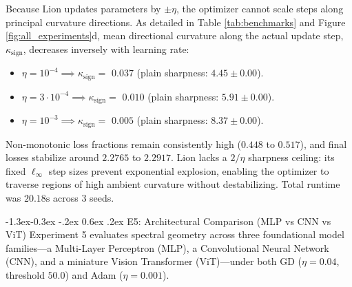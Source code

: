 \documentclass[10pt,twocolumn]{article}
\makeatletter
\renewcommand\subsection{\@startsection{subsection}{2}{\z@}%
                                     {-1.3ex\@plus -0.3ex \@minus -.2ex}%
                                     {0.6ex \@plus .2ex}%
                                     {\normalfont\normalsize\bfseries}}
\makeatother
\begin{document}
Because Lion updates parameters by $\pm \eta$, the optimizer cannot scale steps along principal curvature directions. As detailed in Table \ref{tab:benchmarks} and Figure \ref{fig:all_experiments}d, mean directional curvature along the actual update step, $\kappa_{\text{sign}}$, decreases inversely with learning rate:
\begin{itemize}
    \item $\eta = 10^{-4} \implies \kappa_{\text{sign}} =$
    $0.037$
    (plain sharpness:
    $4.45 \pm 0.00$).
    \item $\eta = 3 \cdot 10^{-4} \implies \kappa_{\text{sign}} =$
    $0.010$
    (plain sharpness:
    $5.91 \pm 0.00$).
    \item $\eta = 10^{-3} \implies \kappa_{\text{sign}} =$
    $0.005$
    (plain sharpness:
    $8.37 \pm 0.00$).
\end{itemize}
Non-monotonic loss fractions remain consistently high ($0.448$ to $0.517$), and final losses stabilize around $2.2765$ to $2.2917$. Lion lacks a $2/\eta$ sharpness ceiling: its fixed $\ell_\infty$ step sizes prevent exponential explosion, enabling the optimizer to traverse regions of high ambient curvature without destabilizing. Total runtime was $20.18\text{s}$ %
across 3 seeds.

\subsection{E5: Architectural Comparison (MLP vs CNN vs ViT)}
Experiment 5 evaluates spectral geometry across three foundational model families—a Multi-Layer Perceptron (MLP), a Convolutional Neural Network (CNN), and a miniature Vision Transformer (ViT)—under both GD ($\eta=0.04$, threshold $50.0$) and Adam ($\eta=0.001$).
\end{document}
